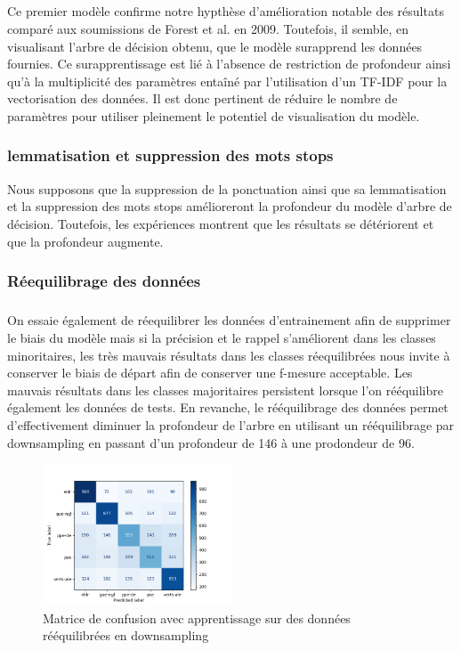 \documentclass[11pt]{article}
\begin{document}
\subparagraph{}
Ce premier modèle confirme notre hypthèse d'amélioration notable des résultats comparé aux soumissions de Forest et al. en 2009. Toutefois, il semble, en visualisant l'arbre de décision obtenu, que le modèle surapprend les données fournies. Ce surapprentissage est lié à l'absence de restriction de profondeur ainsi qu'à la multiplicité des paramètres entaîné par l'utilisation d'un TF-IDF pour la vectorisation des données. Il est donc pertinent de réduire le nombre de paramètres pour utiliser pleinement le potentiel de visualisation du modèle.
\subsubsection{lemmatisation et suppression des mots stops}
Nous supposons que la suppression de la ponctuation ainsi que sa lemmatisation et la suppression des mots stops amélioreront la profondeur du modèle d'arbre de décision. Toutefois, les expériences montrent que les résultats se détériorent et que la profondeur augmente. 
\subsubsection{Réequilibrage des données}
\subparagraph{}
On essaie également de réequilibrer les données d'entrainement afin de supprimer le biais du modèle mais si la précision et le rappel s'améliorent dans les classes minoritaires, les très mauvais résultats dans les classes réequilibrées nous invite à conserver le biais de départ afin de conserver une f-mesure acceptable. Les mauvais résultats dans les classes majoritaires persistent lorsque l'on rééquilibre également les données de tests. En revanche, le rééquilibrage des données permet d'effectivement diminuer la profondeur de l'arbre en utilisant un rééquilibrage par downsampling en passant d'un profondeur de 146 à une prodondeur de 96.

\begin{figure}[h]
\includegraphics[width=0.5\textwidth]{matriceConfusionTreeBalanced}
\caption{Matrice de confusion avec apprentissage sur des données rééquilibrées en downsampling}
\centering
\end{figure}
\end{document}
